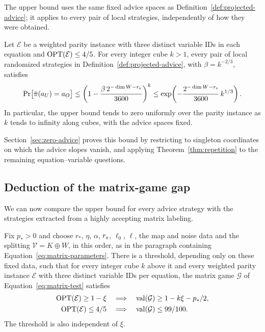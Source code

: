The upper bound uses the same fixed advice spaces as
Definition~\ref{def:projected-advice}; it applies to every pair of local
strategies, independently of how they were obtained.

\begin{lemma}
\label{lem:zero-advice}
Let $\mathcal E$ be a weighted parity instance with three distinct
variable IDs in each equation and $\operatorname{OPT}(\mathcal E)\le4/5$.
For every integer cube $k>1$, every pair of local randomized strategies
in Definition~\ref{def:projected-advice}, with $\beta=k^{-2/3}$, satisfies
\begin{equation}
 \Pr\bigl[\bar\pi(a_U)=a_O\bigr]
 \le \left(1-\frac{\beta\,2^{-\dim W-r_{\rm s}}}{3600}\right)^k
 \le
 \exp\!\left(
 -\frac{2^{-\dim W-r_{\rm s}}}{3600}\,k^{1/3}
 \right).
 \label{eq:zero-advice-agreement-bound}
\end{equation}
In particular, the upper bound tends to zero uniformly over the parity
instance as $k$ tends to infinity along cubes, with the advice spaces
fixed.
\end{lemma}

Section~\ref{sec:zero-advice} proves this bound by restricting to singleton
coordinates on which the advice slopes vanish, and applying
Theorem~\ref{thm:repetition} to the remaining equation--variable questions.

\subsection{Deduction of the matrix-game gap}

We can now compare the upper bound for every advice strategy with the
strategies extracted from a highly accepting matrix labeling.

\begin{proposition}
\label{prop:matrix-gap}
Fix $p_*>0$ and choose $r_*$, $\eta$, $\alpha$, $r_{\rm s}$, $\ell_0$, $\ell$,
the map and noise data and the splitting $\mathcal V=K\oplus W$, in this order,
as in the paragraph containing Equation~\eqref{eq:matrix-parameters}.  There is a threshold, depending only on these fixed data, such that for
every integer cube $k$ above it and every weighted parity instance
$\mathcal E$ with three distinct variable IDs per equation, the matrix
game $\mathcal G$ of Equation~\eqref{eq:matrix-test} satisfies
\[
 \begin{aligned}
 \operatorname{OPT}(\mathcal E)\ge1-\xi
 &\quad\Longrightarrow\quad
 \operatorname{val}(\mathcal G)\ge1-k\xi-p_*/2,\\
 \operatorname{OPT}(\mathcal E)\le4/5
 &\quad\Longrightarrow\quad
 \operatorname{val}(\mathcal G)\le99/100.
 \end{aligned}
\]
The threshold is also independent of $\xi$.
\end{proposition}

